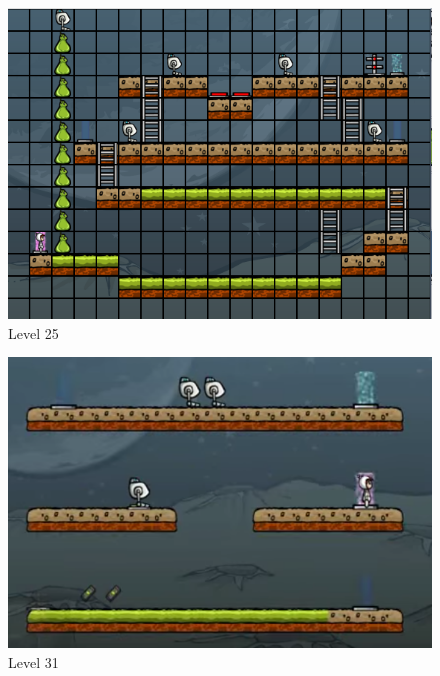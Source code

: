 \begin{figure}
	\centering
	
	\caption{Level 25}
	\label{level25}
	
	\includegraphics[width=1.0\textwidth]{appendix/img/lvl25}
\end{figure}
\begin{figure}
	\centering
	\caption{Level 31}
	\label{level31}
		
	\includegraphics[width=1.0\textwidth]{appendix/img/lvl31}
\end{figure}

